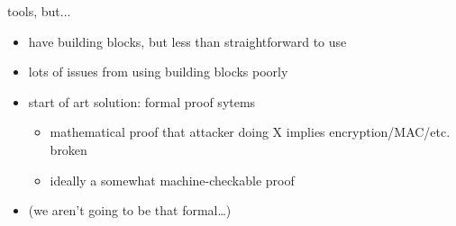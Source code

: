 \begin{frame}{tools, but...}
    \begin{itemize}
    \item have building blocks, but less than straightforward to use
    \vspace{.5cm}
    \item lots of issues from using building blocks poorly
    \item start of art solution: formal proof sytems
        \begin{itemize}
        \item mathematical proof that attacker doing X implies encryption/MAC/etc. broken
        \item ideally a somewhat machine-checkable proof
        \end{itemize}
    \item (we aren't going to be that formal\ldots)
    \end{itemize}
\end{frame}
